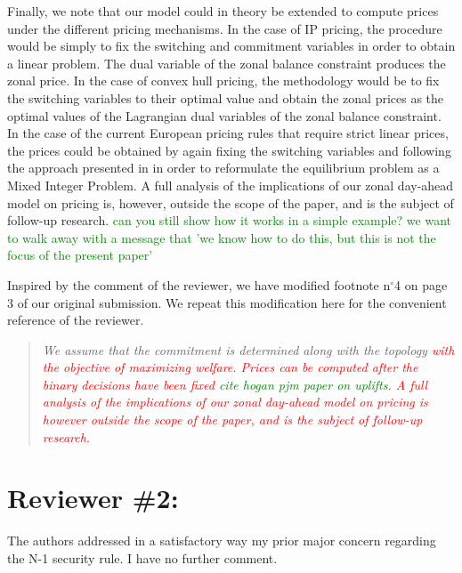 \documentclass[a4paper,11pt]{article}
\begin{document}
{    Finally, we note that our model could in theory be extended to compute prices under the different pricing mechanisms. 
    In the case of IP pricing, the procedure would be simply to fix the switching and commitment variables in order to obtain a linear problem. 
    The dual variable of the zonal balance constraint produces the zonal price. 
    In the case of convex hull pricing, the methodology would be to fix the switching variables to their optimal value and obtain the zonal prices as the optimal values of the Lagrangian dual variables of the zonal balance constraint.
    In the case of the current European pricing rules that require strict linear prices, the prices could be obtained by again fixing the switching variables and following the approach presented in \cite{madani2015} in order to reformulate the equilibrium problem as a Mixed Integer Problem.
    A full analysis of the implications of our zonal day-ahead model on pricing is, however, outside the scope of the paper, and is the subject of follow-up research. \textcolor{green}{can you still show how it works in a simple example? we want to walk away with a message that 'we know how to do this, but this is not the focus of the present paper'}
    
    Inspired by the comment of the reviewer, we have modified footnote n$^\circ$4 on page 3 of our original submission. %
    We repeat this modification here for the convenient reference of the reviewer. 
    \begin{quotation}
        {\it
            We assume that the commitment is determined along with the topology \textcolor{red}{with the objective of maximizing welfare. %
            Prices can be computed after the binary decisions have been fixed \textcolor{green}{cite hogan pjm paper on uplifts}. A full analysis of the implications of our zonal day-ahead model on pricing is however outside the scope of the paper, and is the subject of follow-up research.}
        }
    \end{quotation}
}

\section{Reviewer \#2:}
The authors addressed in a satisfactory way my prior major concern regarding the N-1 security rule. I have no further comment.




\end{document}
